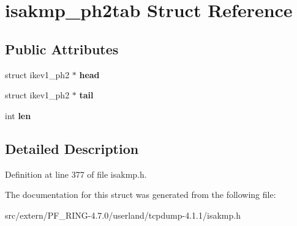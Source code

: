 \hypertarget{structisakmp__ph2tab}{
\section{isakmp\_\-ph2tab Struct Reference}
\label{structisakmp__ph2tab}
}
\subsection*{Public Attributes}
\begin{DoxyCompactItemize}
\item 
\hypertarget{structisakmp__ph2tab_a18503109528c6ad7566eeeb9fae99c4b}{
struct ikev1\_\-ph2 $\ast$ {\bfseries head}}
\label{structisakmp__ph2tab_a18503109528c6ad7566eeeb9fae99c4b}

\item 
\hypertarget{structisakmp__ph2tab_abc09010f16884842a5641abf3fab326e}{
struct ikev1\_\-ph2 $\ast$ {\bfseries tail}}
\label{structisakmp__ph2tab_abc09010f16884842a5641abf3fab326e}

\item 
\hypertarget{structisakmp__ph2tab_a144cf25b8d328fe5458a5e625657f8ad}{
int {\bfseries len}}
\label{structisakmp__ph2tab_a144cf25b8d328fe5458a5e625657f8ad}

\end{DoxyCompactItemize}


\subsection{Detailed Description}


Definition at line 377 of file isakmp.h.



The documentation for this struct was generated from the following file:\begin{DoxyCompactItemize}
\item 
src/extern/PF\_\-RING-\/4.7.0/userland/tcpdump-\/4.1.1/isakmp.h\end{DoxyCompactItemize}

